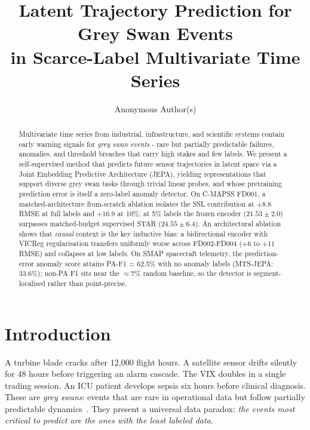 \documentclass{article}
\title{Latent Trajectory Prediction for Grey Swan Events\\in Scarce-Label Multivariate Time Series}
\author{Anonymous Author(s)}
\begin{document}
\maketitle

\begin{abstract}
Multivariate time series from industrial, infrastructure, and scientific systems contain early warning signals for \emph{grey swan events} - rare but partially predictable failures, anomalies, and threshold breaches that carry high stakes and few labels. We present a self-supervised method that predicts future sensor trajectories in latent space via a Joint Embedding Predictive Architecture (JEPA), yielding representations that support diverse grey swan tasks through trivial linear probes, and whose pretraining prediction error is itself a zero-label anomaly detector. On C-MAPSS FD001, a matched-architecture from-scratch ablation isolates the SSL contribution at $+8.8$ RMSE at full labels and $+16.9$ at 10\%; at 5\% labels the frozen encoder ($21.53 \pm 2.0$) surpasses matched-budget supervised STAR ($24.55 \pm 6.4$). An architectural ablation shows that \emph{causal} context is the key inductive bias: a bidirectional encoder with VICReg regularisation transfers uniformly worse across FD002-FD004 ($+6$ to $+11$ RMSE) and collapses at low labels. On SMAP spacecraft telemetry, the prediction-error anomaly score attains PA-F1 = 62.5\% with no anomaly labels (MTS-JEPA: 33.6\%); non-PA F1 sits near the $\approx7\%$ random baseline, so the detector is segment-localised rather than point-precise.
\end{abstract}

\section{Introduction}
\label{sec:intro}

A turbine blade cracks after 12{,}000 flight hours. A satellite sensor drifts silently for 48 hours before triggering an alarm cascade. The VIX doubles in a single trading session. An ICU patient develops sepsis six hours before clinical diagnosis. These are \emph{grey swans}: events that are rare in operational data but follow partially predictable dynamics~\citep{taleb2007blackswan,greyswan_supplychain2025}. They present a universal data paradox: \emph{the events most critical to predict are the ones with the least labeled data}.
\end{document}

